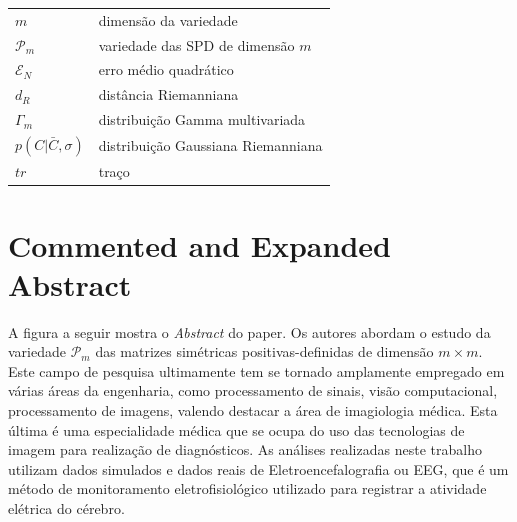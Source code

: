 \documentclass[a4paper,titlepage]{article}
\begin{document}
\begin{table}[H]
  \begin{tabularx}{\textwidth}{@{}XX@{}}
    \toprule
    $m$ & dimensão da variedade \\
    $\mathcal{P}_m$ & variedade das SPD de dimensão $m$\\
    $\mathcal{E}_N$ & erro médio quadrático\\
    $d_R$ & distância Riemanniana\\
    $\Gamma_m$ & distribuição Gamma multivariada\\
    $p(C|\bar{C},\sigma)$ & distribuição Gaussiana Riemanniana\\
    $tr$ & traço \\
    \bottomrule
  \end{tabularx}
\end{table}

\section{Commented and Expanded Abstract}

A figura a seguir mostra o \textit{Abstract} do paper. Os autores abordam o
estudo da variedade $\mathcal{P}_m$ das matrizes simétricas positivas-definidas
de dimensão $m \times m$. Este campo de pesquisa ultimamente tem se tornado
amplamente empregado em várias áreas da engenharia, como processamento de
sinais, visão computacional, processamento de imagens, valendo destacar a área
de imagiologia médica. Esta última é uma especialidade médica que se ocupa do
uso das tecnologias de imagem para realização de diagnósticos. As análises
realizadas neste trabalho utilizam dados simulados e dados reais de
Eletroencefalografia ou EEG, que é um método de monitoramento eletrofisiológico
utilizado para registrar a atividade elétrica do cérebro. 

\begin{center}
  \vspace{1em}
  \vspace{1em}
\end{center}
\end{document}

